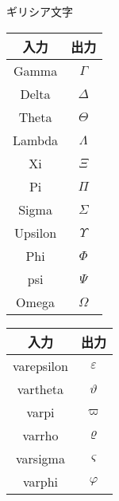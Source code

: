 \documentclass[slide,dvipdfmx]{beamer}
\newcommand{\bs}{\texttt{\symbol{"5C}}}
\begin{document}
\begin{frame}{ギリシア文字}

\begin{multicols}{2}

\begin{tabular}{|c|c|} \hline
入力 & 出力 \\ \hline
\bs Gamma & $\Gamma$ \\ \hline
\bs Delta & $\Delta$ \\ \hline
\bs Theta & $\Theta$ \\ \hline
\bs Lambda & $\Lambda$ \\ \hline
\bs Xi & $\Xi$ \\ \hline
\bs Pi & $\Pi$ \\ \hline
\bs Sigma & $\Sigma$ \\ \hline
\bs Upsilon & $\Upsilon$ \\ \hline
\bs Phi & $\Phi$ \\ \hline
\bs psi & $\Psi$ \\ \hline
\bs Omega & $\Omega$ \\ \hline
\end{tabular}

\begin{tabular}{|c|c|} \hline
入力 & 出力 \\ \hline
\bs varepsilon & $\varepsilon$ \\ \hline
\bs vartheta & $\vartheta$ \\ \hline
\bs varpi & $\varpi$ \\ \hline
\bs varrho & $\varrho$ \\ \hline
\bs varsigma & $\varsigma$ \\ \hline
\bs varphi & $\varphi$ \\ \hline
\end{tabular}

\end{multicols}

\end{frame}
\end{document}
